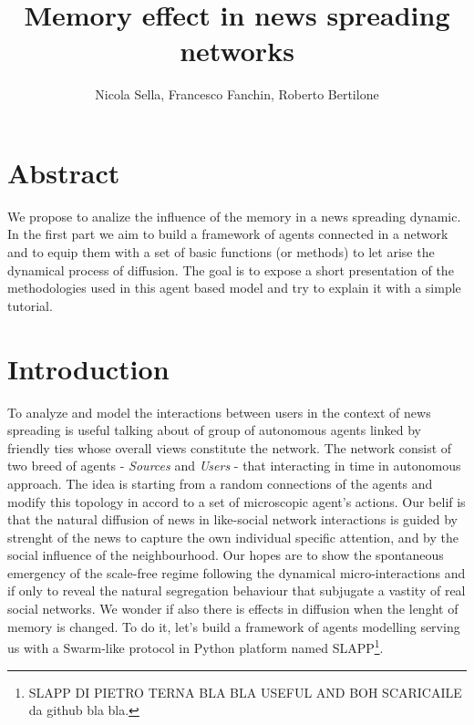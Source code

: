 \documentclass[11pt]{article} %
\title{Memory effect in news spreading networks}
\author{Nicola Sella, Francesco Fanchin, Roberto Bertilone}
\begin{document}
\maketitle
\section*{Abstract}
We propose to analize the influence of the memory in a news spreading dynamic. In the first part we aim to build a framework of agents 
connected in a network and to equip them with a set of basic functions (or methods) to let arise the dynamical process of diffusion.
The goal is to expose a short presentation of the methodologies used in this agent based model and try to explain it with a simple tutorial.

\section{Introduction}

To analyze and model the interactions between users in the context of news spreading is useful talking about of group of autonomous 
agents linked by friendly ties whose overall views constitute the network.
The network consist of two breed of agents - {\itshape Sources} and {\itshape Users} - that interacting in time in autonomous approach. The idea is starting from 
a random connections of the agents and modify this topology in accord to a set of microscopic agent's actions. Our belif is that the natural diffusion
 of news in like-social network interactions is guided by strenght of the news to capture the own individual specific attention, and by the social influence 
of the neighbourhood. Our hopes are to show the spontaneous emergency of the scale-free regime following the dynamical micro-interactions and if only to reveal 
the natural segregation behaviour that subjugate a vastity of real social networks.  We wonder if also there is effects in diffusion when the lenght of memory is changed.
To do it, let's build a framework of agents modelling serving us with a Swarm-like protocol in Python platform named SLAPP\footnote{SLAPP DI PIETRO TERNA BLA BLA USEFUL AND BOH SCARICAILE da github bla bla.}.
\end{document}
